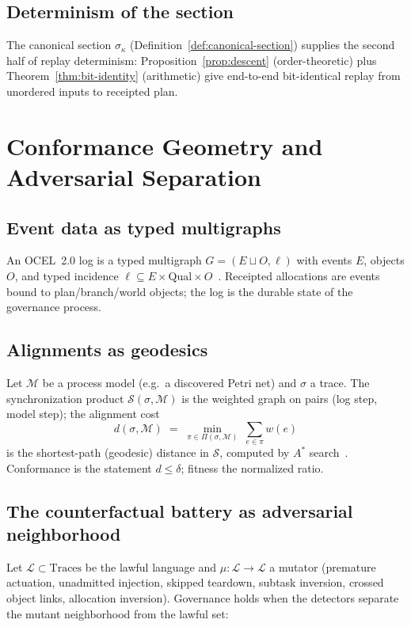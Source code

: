 \documentclass[12pt,oneside]{report}
\theoremstyle{plain}
\theoremstyle{definition}
\theoremstyle{remark}
\begin{document}
\section{Determinism of the section}

The canonical section $\sigma_\kappa$
(Definition~\ref{def:canonical-section}) supplies the second half of
replay determinism: Proposition~\ref{prop:descent} (order-theoretic)
plus Theorem~\ref{thm:bit-identity} (arithmetic) give end-to-end
bit-identical replay from unordered inputs to receipted plan.

\chapter{Conformance Geometry and Adversarial Separation}
\label{ch:conformance}

\section{Event data as typed multigraphs}

An OCEL~2.0 log is a typed multigraph $G=(E\sqcup O, \ell)$ with events
$E$, objects $O$, and typed incidence $\ell\subseteq
E\times\mathrm{Qual}\times O$~\cite{ocel2}. Receipted allocations are
events bound to plan/branch/world objects; the log is the durable
state of the governance process.

\section{Alignments as geodesics}

Let $\mathcal{M}$ be a process model (e.g.\ a discovered Petri net) and
$\sigma$ a trace. The synchronization product $\mathcal{S}(\sigma,
\mathcal{M})$ is the weighted graph on pairs (log step, model step);
the alignment cost
\begin{equation}
d(\sigma,\mathcal{M}) \;=\; \min_{\pi\in\Pi(\sigma,\mathcal{M})}
\;\sum_{e\in\pi} w(e)
\end{equation}
is the shortest-path (geodesic) distance in $\mathcal{S}$, computed by
$A^\ast$ search~\cite{pm4py}. Conformance is the statement
$d\le\delta$; fitness the normalized ratio.

\section{The counterfactual battery as adversarial neighborhood}

Let $\mathcal{L}\subset\mathrm{Traces}$ be the lawful language and
$\mu:\mathcal{L}\to\mathcal{L}$ a mutator (premature actuation,
unadmitted injection, skipped teardown, subtask inversion, crossed
object links, allocation inversion). Governance holds when the detectors
separate the mutant neighborhood from the lawful set:
\end{document}
